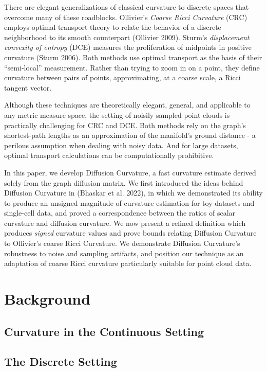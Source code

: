 \documentclass[
  letterpaper,
  DIV=11,
  numbers=noendperiod]{scrartcl}
\theoremstyle{plain}
\theoremstyle{plain}
\theoremstyle{definition}
\theoremstyle{definition}
\theoremstyle{remark}
\begin{document}
There are elegant generalizations of classical curvature to discrete
spaces that overcome many of these roadblocks. Ollivier's \emph{Coarse
Ricci Curvature} (CRC) employs optimal transport theory to relate the
behavior of a discrete neighborhood to its smooth counterpart (Ollivier
2009). Sturm's \emph{displacement convexity of entropy} (DCE) measures
the proliferation of midpoints in positive curvature (Sturm 2006). Both
methods use optimal transport as the basis of their ``semi-local''
measurement. Rather than trying to zoom in on a point, they define
curvature between pairs of points, approximating, at a coarse scale, a
Ricci tangent vector.

Although these techniques are theoretically elegant, general, and
applicable to any metric measure space, the setting of noisily sampled
point clouds is practically challenging for CRC and DCE. Both methods
rely on the graph's shortest-path lengths as an approximation of the
manifold's ground distance - a perilous assumption when dealing with
noisy data. And for large datasets, optimal transport calculations can
be computationally prohibitive.

In this paper, we develop Diffusion Curvature, a fast curvature estimate
derived solely from the graph diffusion matrix. We first introduced the
ideas behind Diffusion Curvature in (Bhaskar et al. 2022), in which we
demonstrated its ability to produce an unsigned magnitude of curvature
estimation for toy datasets and single-cell data, and proved a
correspondence between the ratios of scalar curvature and diffusion
curvature. We now present a refined definition which produces
\emph{signed} curvature values and prove bounds relating Diffusion
Curvature to Ollivier's coarse Ricci Curvature. We demonstrate Diffusion
Curvature's robustness to noise and sampling artifacts, and position our
technique as an adaptation of coarse Ricci curvature particularly
suitable for point cloud data.

\section{Background}\label{background}

\subsection{Curvature in the Continuous
Setting}\label{curvature-in-the-continuous-setting}

\subsection{The Discrete Setting}\label{the-discrete-setting}
\end{document}
